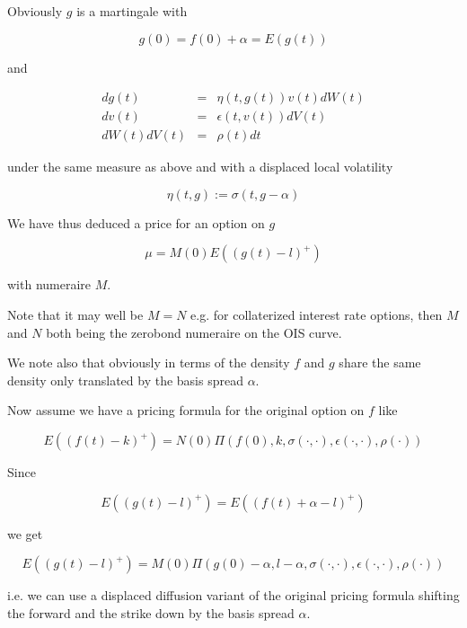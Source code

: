 \documentclass{amsart}
\theoremstyle{plain}
\numberwithin{equation}{section}
\begin{document}
Obviously $g$ is a martingale with 

\begin{equation}
g(0) = f(0) + \alpha = E( g(t) )
\end{equation}

and 

\begin{eqnarray}
dg(t) &=& \eta(t,g(t)) v(t) dW(t) \\
dv(t) &=& \epsilon(t,v(t)) dV(t) \\
dW(t) dV(t) &=& \rho(t) dt
\end{eqnarray}

under the same measure as above and with a displaced local volatility 

\begin{equation}
\eta(t,g) := \sigma(t,g-\alpha)
\end{equation}

We have thus deduced a price for an option on $g$

\begin{equation}
\mu = M(0) E( (g(t)-l)^+ ) 
\end{equation}

with numeraire $M$.

Note that it may well be $M=N$ e.g. for collaterized interest rate options, then $M$ and $N$ both being the zerobond numeraire on the OIS curve.

We note also that obviously in terms of the density $f$ and $g$ share the same density only translated by the basis spread $\alpha$.

Now assume we have a pricing formula for the original option on $f$ like

\begin{equation}
E( (f(t) - k)^+ ) = N(0) \Pi(f(0),k,\sigma(\cdot,\cdot),\epsilon(\cdot,\cdot),\rho(\cdot))
\end{equation}

Since 

\begin{equation}
E( (g(t)-l)^+ ) = E( (f(t)+\alpha-l)^+ )
\end{equation}

we get

\begin{equation}
E( (g(t)-l)^+ ) = M(0) \Pi(g(0)-\alpha,l-\alpha,\sigma(\cdot,\cdot),\epsilon(\cdot,\cdot),\rho(\cdot))
\end{equation}

i.e. we can use a displaced diffusion variant of the original pricing formula shifting the forward and
the strike down by the basis spread $\alpha$.
\end{document}
